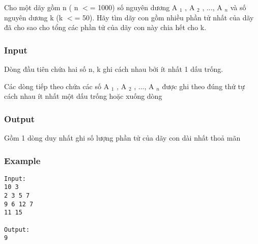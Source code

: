 



   Cho một dãy gồm n ( n $<$= 1000) số nguyên dương A   $_    1   $   , A   $_    2   $   , ..., A   $_    n   $   và số nguyên dương k (k $<$= 50). Hãy tìm dãy con gồm nhiều phần tử nhất của dãy đã cho sao cho tổng các phần tử của dãy con này chia hết cho k.  

\subsubsection{   Input  }

   Dòng đầu tiên chứa hai số n, k ghi cách nhau bởi ít nhất 1 dấu trống.  

   Các dòng tiếp theo chứa các số A   $_    1   $   , A   $_    2   $   , ..., A   $_    n   $   được ghi theo đúng thứ tự cách nhau ít nhất một dấu trống hoặc xuống dòng  

\subsubsection{   Output  }

   Gồm 1 dòng duy nhất ghi số lượng phần tử của dãy con dài nhất thoả mãn  

\subsubsection{   Example  }
\begin{verbatim}
Input:
10 3
2 3 5 7
9 6 12 7
11 15

Output:
9
\end{verbatim}